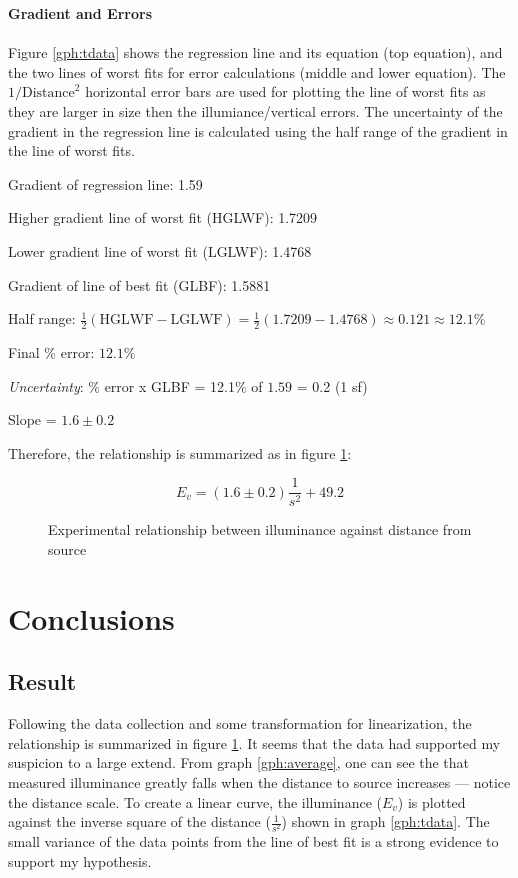 \documentclass[a4paper,12pt]{article}
\newcommand{\paragraphnl}[1]{\textbf{#1}\\\\}
\begin{document}
\paragraphnl{Gradient and Errors}
Figure \ref{gph:tdata} shows the regression line and its equation (top equation), and the two lines of worst fits for error calculations (middle and lower equation). The $1/\text{Distance}^2$ horizontal error bars are used for plotting the line of worst fits as they are larger in size then the illumiance/vertical errors. The uncertainty of the gradient in the regression line is calculated using the half range of the gradient in the line of worst fits.


Gradient of regression line: 1.59

Higher gradient line of worst fit (HGLWF): 1.7209

Lower gradient line of worst fit (LGLWF): 1.4768

Gradient of line of best fit (GLBF): 1.5881

Half range: $\frac{1}{2} (\text{HGLWF} - \text{LGLWF})= \frac{1}{2}(1.7209-1.4768) \approx 0.121 \approx 12.1\% $

Final \% error: $12.1\%$

\textit{Uncertainty}: \% error x GLBF = 12.1\% of $1.59$ = 0.2 (1 sf)

Slope = $1.6 \pm 0.2$

Therefore, the relationship is summarized as in figure \ref{fig:rel}:
\begin{figure}[h!]
    \[
       E_v = (1.6 \pm 0.2) \frac{1}{s^2} + 49.2
    \]
    \caption{Experimental relationship between illuminance against distance from source}
    \label{fig:rel}
\end{figure}

\section{Conclusions}
\subsection{Result}

Following the data collection and some transformation for linearization, the relationship is summarized in figure \ref{fig:rel}. It seems that the data had supported my suspicion to a large extend. From graph \ref{gph:average}, one can see the that measured illuminance  greatly falls when the distance to source increases --- notice the distance scale. To create a linear curve, the illuminance ($E_v$) is plotted against the inverse square of the distance ($\frac{1}{s^2}$) shown in graph \ref{gph:tdata}. The small variance of the data points from the line of best fit is a strong evidence to support my hypothesis.
\end{document}

